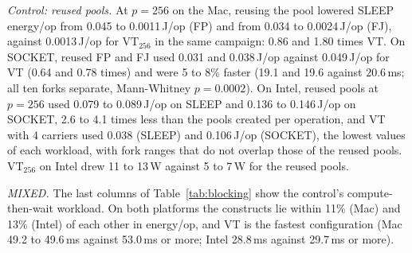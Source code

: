 \emph{Control: reused pools.} At $p = 256$ on the Mac, reusing the pool lowered SLEEP energy/op from 0.045 to 0.0011\,J/op (FP) and from 0.034 to 0.0024\,J/op (FJ), against 0.0013\,J/op for $\mathrm{VT}_{256}$ in the same campaign: 0.86 and 1.80 times VT. On SOCKET, reused FP and FJ used 0.031 and 0.038\,J/op against 0.049\,J/op for VT (0.64 and 0.78 times) and were 5 to 8\% faster (19.1 and 19.6 against 20.6\,ms; all ten forks separate, Mann-Whitney $p = 0.0002$). On Intel, reused pools at $p = 256$ used 0.079 to 0.089\,J/op on SLEEP and 0.136 to 0.146\,J/op on SOCKET, 2.6 to 4.1 times less than the pools created per operation, and VT with 4 carriers used 0.038 (SLEEP) and 0.106\,J/op (SOCKET), the lowest values of each workload, with fork ranges that do not overlap those of the reused pools. $\mathrm{VT}_{256}$ on Intel drew 11 to 13\,W against 5 to 7\,W for the reused pools.

\emph{MIXED.} The last columns of Table~\ref{tab:blocking} show the control's compute-then-wait workload. On both platforms the constructs lie within 11\% (Mac) and 13\% (Intel) of each other in energy/op, and VT is the fastest configuration (Mac 49.2 to 49.6\,ms against 53.0\,ms or more; Intel 28.8\,ms against 29.7\,ms or more).


